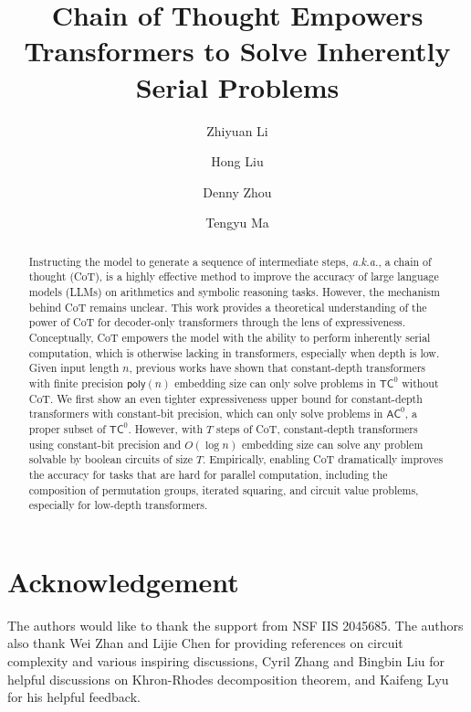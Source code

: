 \documentclass[11pt]{article} %
\title{Chain of Thought Empowers Transformers to Solve Inherently Serial Problems}
\author[1,2]{Zhiyuan Li}
\author[1]{Hong Liu}
\author[3]{Denny Zhou}
\author[1]{Tengyu Ma}
\date{}
\affil[1]{Stanford University}
\affil[2]{Toyota Technological Institute at Chicago}
\affil[3]{Google}
\theoremstyle{definition}
\numberwithin{theorem}{section}
\numberwithin{definition}{section}
\begin{document}
\maketitle


\begin{abstract}
Instructing the model to generate a sequence of intermediate steps, \emph{a.k.a.}, a chain of thought (CoT), is a highly effective method to improve the accuracy of large language models (LLMs) on arithmetics and symbolic reasoning tasks. However, the mechanism behind CoT remains unclear. 
This work provides a theoretical understanding of the power of CoT for decoder-only transformers through the lens of expressiveness. Conceptually, CoT empowers the model with the ability to perform inherently serial computation, which is otherwise lacking in transformers, especially when depth is low. Given input length $n$, previous works have shown that constant-depth transformers with finite precision $\mathsf{poly}(n)$ embedding size can only solve problems in $\mathsf{TC}^0$ without CoT. We first show an even tighter expressiveness upper bound for constant-depth transformers with constant-bit precision, which can only solve problems in $\mathsf{AC}^0$, a proper subset of $ \mathsf{TC}^0$. However, with $T$ steps of CoT, constant-depth transformers using constant-bit precision and $O(\log n)$ embedding size can solve any problem solvable by boolean circuits of size $T$. Empirically, enabling CoT dramatically improves the accuracy for tasks that are hard for parallel computation, including the composition of permutation groups, iterated squaring, and circuit value problems, especially for low-depth transformers. 


\end{abstract}




%







\section*{Acknowledgement}
The authors would like to thank the support from NSF IIS 2045685. The authors also thank Wei Zhan and Lijie Chen for providing references on circuit complexity and various inspiring discussions, Cyril Zhang and Bingbin Liu for helpful discussions on Khron-Rhodes decomposition theorem, and Kaifeng Lyu for his helpful feedback.



\appendix

\newpage
\appendix
{
  \hypersetup{linkcolor=black}
  \tableofcontents
}
\newpage








\end{document}
